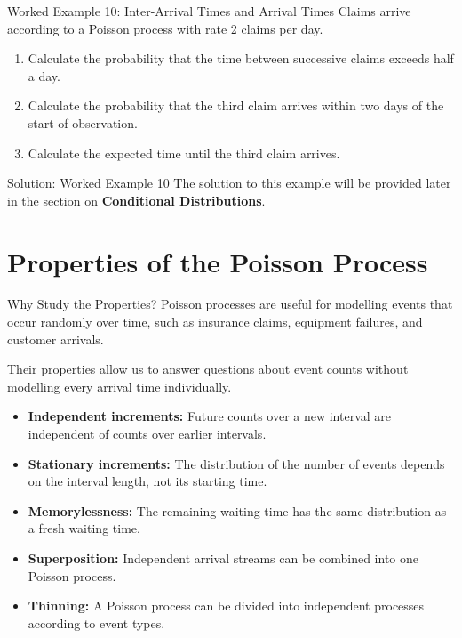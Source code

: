 \documentclass[
  ignorenonframetext,
  aspectratio=169,
]{beamer}
\providecommand{\tightlist}{%
  \setlength{\itemsep}{0pt}\setlength{\parskip}{0pt}}
\begin{document}
\begin{frame}{Worked Example 10: Inter-Arrival Times and Arrival Times}
\protect{}\label{worked-example-10-inter-arrival-times-and-arrival-times}
Claims arrive according to a Poisson process with rate 2 claims per day.

\begin{enumerate}
\tightlist
\item
  Calculate the probability that the time between successive claims
  exceeds half a day.
\item
  Calculate the probability that the third claim arrives within two days
  of the start of observation.
\item
  Calculate the expected time until the third claim arrives.
\end{enumerate}
\end{frame}

\begin{frame}{Solution: Worked Example 10}
\protect{}\label{solution-worked-example-10}
The solution to this example will be provided later in the section on
\textbf{Conditional Distributions}.
\end{frame}

\section{Properties of the Poisson
Process}\label{properties-of-the-poisson-process}

\begin{frame}{Why Study the Properties?}
\protect{}\label{why-study-the-properties}
Poisson processes are useful for modelling events that occur randomly
over time, such as insurance claims, equipment failures, and customer
arrivals.

Their properties allow us to answer questions about event counts without
modelling every arrival time individually.

\begin{itemize}
\tightlist
\item
  \textbf{Independent increments:} Future counts over a new interval are
  independent of counts over earlier intervals.
\item
  \textbf{Stationary increments:} The distribution of the number of
  events depends on the interval length, not its starting time.
\item
  \textbf{Memorylessness:} The remaining waiting time has the same
  distribution as a fresh waiting time.
\item
  \textbf{Superposition:} Independent arrival streams can be combined
  into one Poisson process.
\item
  \textbf{Thinning:} A Poisson process can be divided into independent
  processes according to event types.
\end{itemize}
\end{frame}
\end{document}
